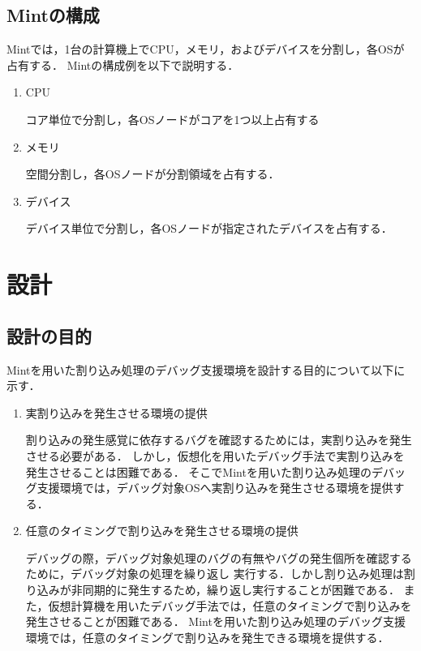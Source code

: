 \documentclass[12pt]{jsarticle}
\begin{document}
\subsection{Mintの構成}
Mintでは，1台の計算機上でCPU，メモリ，およびデバイスを分割し，各OSが占有する．
Mintの構成例を以下で説明する．
\begin{enumerate}
\item CPU

コア単位で分割し，各OSノードがコアを1つ以上占有する
\item メモリ

空間分割し，各OSノードが分割領域を占有する．
\item デバイス

デバイス単位で分割し，各OSノードが指定されたデバイスを占有する．
\end{enumerate}
\section{設計}
\subsection{設計の目的}
Mintを用いた割り込み処理のデバッグ支援環境を設計する目的について以下に示す．
\begin{enumerate}

\item 実割り込みを発生させる環境の提供

割り込みの発生感覚に依存するバグを確認するためには，実割り込みを発生させる必要がある．
しかし，仮想化を用いたデバッグ手法で実割り込みを発生させることは困難である．
そこでMintを用いた割り込み処理のデバッグ支援環境では，デバッグ対象OSへ実割り込みを発生させる環境を提供する．
\item 任意のタイミングで割り込みを発生させる環境の提供

デバッグの際，デバッグ対象処理のバグの有無やバグの発生個所を確認するために，デバッグ対象の処理を繰り返し
実行する．しかし割り込み処理は割り込みが非同期的に発生するため，繰り返し実行することが困難である．
また，仮想計算機を用いたデバッグ手法では，任意のタイミングで割り込みを発生させることが困難である．
Mintを用いた割り込み処理のデバッグ支援環境では，任意のタイミングで割り込みを発生できる環境を提供する．
\end{enumerate}
\end{document}
